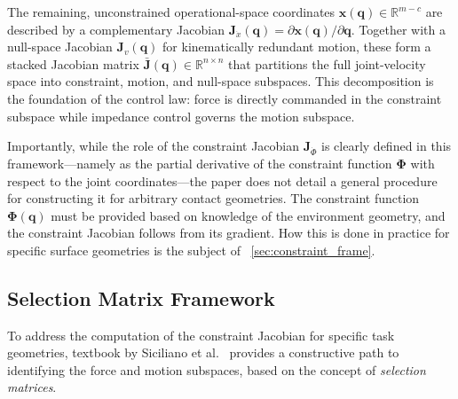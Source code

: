\documentclass[
	german,%
	accentcolor=9c,%
	ruledheaders=section,%
	class=report,%
	thesis={type=bachelor},%
	fontsize=11pt,%
	parskip=half-,%
	custommargins=true,%
	marginpar=false,%
]{tudapub}
\begin{document}
The remaining, unconstrained operational-space coordinates
$\mathbf{x}(\mathbf{q}) \in \mathbb{R}^{m-c}$ are described by a complementary
Jacobian
$\mathbf{J}_{\dot{x}}(\mathbf{q}) = \partial\mathbf{x}(\mathbf{q})/\partial\mathbf{q}$.
Together with a null-space Jacobian $\mathbf{J}_{v}(\mathbf{q})$ for
kinematically redundant motion, these form a stacked Jacobian matrix
$\bar{\mathbf{J}}(\mathbf{q}) \in \mathbb{R}^{n \times n}$ that partitions the
full joint-velocity space into constraint, motion, and null-space subspaces.
This decomposition is the foundation of the control law: force is directly
commanded in the constraint subspace while impedance control governs the motion
subspace.

Importantly, while the role of the constraint Jacobian $\mathbf{J}_{\dot{\Phi}}$
is clearly defined in this framework---namely as the partial derivative of the
constraint function $\boldsymbol{\Phi}$ with respect to the joint coordinates---the
paper does not detail a general procedure for constructing it for arbitrary contact
geometries.
The constraint function $\boldsymbol{\Phi}(\mathbf{q})$ must be provided based on
knowledge of the environment geometry, and the constraint Jacobian follows from its
gradient.
How this is done in practice for specific surface geometries is the subject of
~\ref{sec:constraint_frame}.

\subsection{Selection Matrix Framework}

To address the computation of the constraint Jacobian for specific task geometries, textbook by Siciliano et al.~\cite{Siciliano_Sciavicco_Villani_Oriolo_2009} provides a constructive path to identifying the force and motion subspaces, based on the concept of \emph{selection matrices}.
\end{document}
